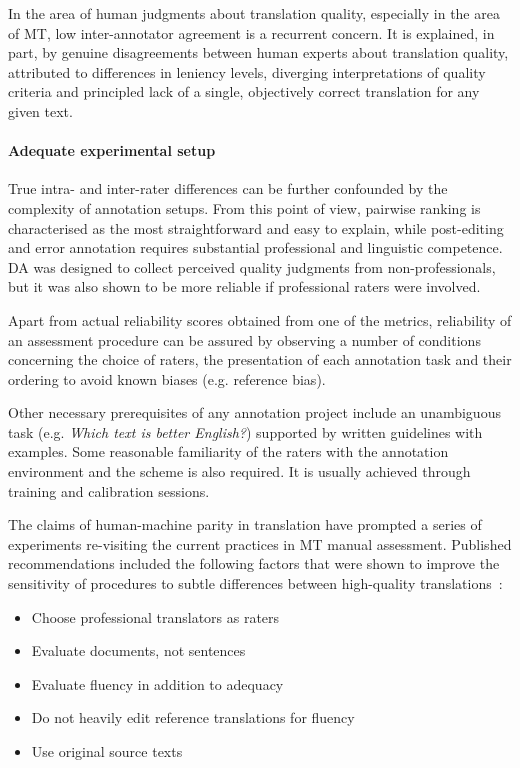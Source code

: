 In the area of human judgments about translation quality, especially in the area of MT, low inter-annotator agreement is a recurrent concern. It is explained, in part, by genuine disagreements between human experts about translation  quality, attributed to differences in leniency levels, diverging interpretations of quality criteria and principled lack of a single, objectively correct translation for any given text. 

\paragraph{Adequate experimental setup} 
True intra- and inter-rater differences can be further confounded by the complexity of annotation setups. From this point of view, pairwise ranking is characterised as the most straightforward and easy to explain, while post-editing and error annotation requires substantial professional and linguistic competence. \gls{DA} was designed to collect perceived quality judgments from non-professionals, but it was also shown to be more reliable if professional raters were involved. 

Apart from actual reliability scores obtained from one of the metrics, reliability of an assessment procedure can be assured by observing a number of conditions concerning the choice of raters, the presentation of each annotation task and their ordering to avoid known biases (e.g. reference bias).

Other necessary prerequisites of any annotation project include an unambiguous task (e.g. \emph{Which text is better English?}) supported by written guidelines with examples. Some reasonable familiarity of the raters with the annotation environment and the scheme is also required. It is usually achieved through training and calibration sessions. 

The claims of human-machine parity in translation have prompted a series of experiments re-visiting the current practices in MT manual assessment. Published recommendations included the following factors that were shown to improve the sensitivity of procedures to subtle differences between high-quality translations~\cite{Laubli2020}:

\begin{itemize}\compresslist{}
	\item Choose professional translators as raters
	\item Evaluate documents, not sentences
	\item Evaluate fluency in addition to adequacy
	\item Do not heavily edit reference translations for fluency
	\item Use original source texts
\end{itemize}

